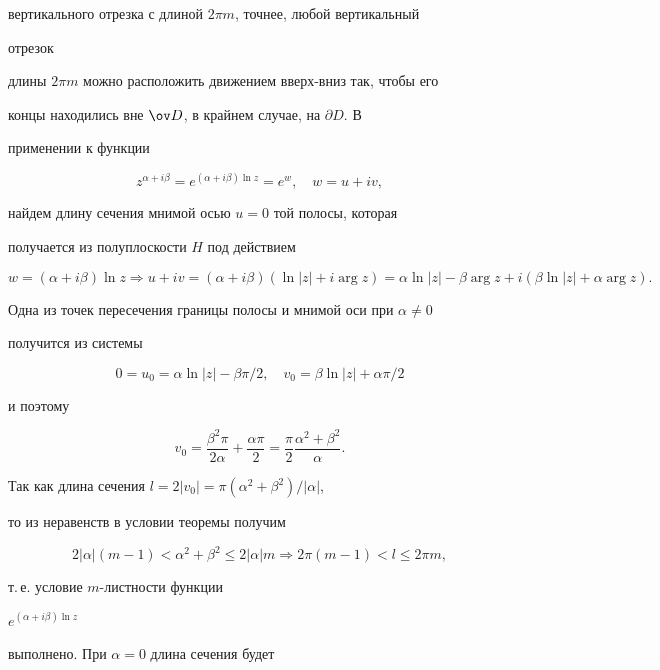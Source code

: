 вертикального отрезка с длиной $2\pi m$, точнее, любой вертикальный 


отрезок 


длины $2\pi m$  можно расположить движением вверх-вниз так, чтобы его 


концы находились вне $\ov D$, в крайнем случае, на $\partial D$. В 


применении к функции 


$$ 


z^{\alpha+i\beta}=e^{(\alpha+i\beta)\ln z}=e^w,\quad 


w=u+i v, 


$$ 


найдем длину сечения мнимой осью $u=0$ той полосы, которая 


получается из полуплоскости $H$ под действием 


$$ 


w=(\alpha+i\beta)\ln z\Longrightarrow u+i v=(\alpha+i\beta) 


(\ln|z|+i\arg z)=\alpha\ln|z|-\beta\arg z+ 


i(\beta\ln|z|+\alpha\arg z). 


$$ 


Одна из точек пересечения границы полосы и мнимой оси при $\alpha\ne 0$ 


получится из системы 


$$ 


0=u_0=\alpha\ln|z|-\beta\pi/2,\quad 


v_0=\beta\ln|z|+\alpha\pi/2 


$$ 


и поэтому 


$$ 


v_0=\frac{\beta^2\pi}{2\alpha}+\frac{\alpha\pi}{2}= 


\frac{\pi}{2}\frac{\alpha^2+\beta^2}{\alpha}. 


$$ 


Так как длина сечения $l=2|v_0|=\pi(\alpha^2+\beta^2)/|\alpha|$, 


то из неравенств в условии теоремы получим 


$$ 


2|\alpha|(m-1)<\alpha^2+\beta^2\le 2|\alpha|m\Longrightarrow 


2\pi(m-1)<l\le 2\pi m, 


$$ 


т.\,е. условие $m$-листности функции 


$e^{(\alpha+i\beta)\ln z}$ 


выполнено. При $\alpha=0$ длина сечения будет 


